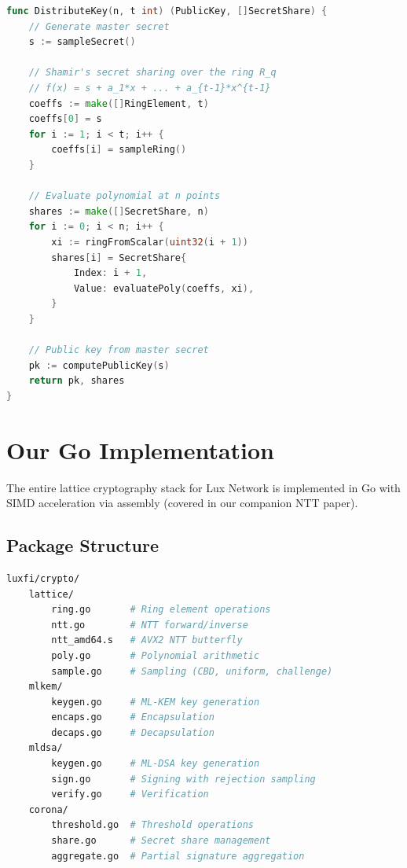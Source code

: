 \documentclass[11pt,a4paper]{article}
\begin{document}
\begin{lstlisting}[language=Go,caption={Corona key generation via Shamir's secret sharing over $R_q$}]
func DistributeKey(n, t int) (PublicKey, []SecretShare) {
    // Generate master secret
    s := sampleSecret()

    // Shamir's secret sharing over the ring R_q
    // f(x) = s + a_1*x + ... + a_{t-1}*x^{t-1}
    coeffs := make([]RingElement, t)
    coeffs[0] = s
    for i := 1; i < t; i++ {
        coeffs[i] = sampleRing()
    }

    // Evaluate polynomial at n points
    shares := make([]SecretShare, n)
    for i := 0; i < n; i++ {
        xi := ringFromScalar(uint32(i + 1))
        shares[i] = SecretShare{
            Index: i + 1,
            Value: evaluatePoly(coeffs, xi),
        }
    }

    // Public key from master secret
    pk := computePublicKey(s)
    return pk, shares
}
\end{lstlisting}

\section{Our Go Implementation}

The entire lattice cryptography stack for Lux Network is implemented in Go with SIMD
acceleration via assembly (covered in our companion NTT paper).

\subsection{Package Structure}

\begin{lstlisting}[language=bash,caption={Package layout}]
luxfi/crypto/
    lattice/
        ring.go       # Ring element operations
        ntt.go        # NTT forward/inverse
        ntt_amd64.s   # AVX2 NTT butterfly
        poly.go       # Polynomial arithmetic
        sample.go     # Sampling (CBD, uniform, challenge)
    mlkem/
        keygen.go     # ML-KEM key generation
        encaps.go     # Encapsulation
        decaps.go     # Decapsulation
    mldsa/
        keygen.go     # ML-DSA key generation
        sign.go       # Signing with rejection sampling
        verify.go     # Verification
    corona/
        threshold.go  # Threshold operations
        share.go      # Secret share management
        aggregate.go  # Partial signature aggregation
\end{lstlisting}
\end{document}
